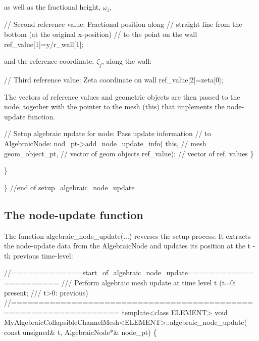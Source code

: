 as well as the fractional height, $ \omega_j $,


\begin{DoxyCodeInclude}
     \textcolor{comment}{// Second reference value: Fractional position along }
     \textcolor{comment}{// straight line from the bottom (at the original x-position)}
     \textcolor{comment}{// to the point on the wall}
     ref\_value[1]=y/r\_wall[1];

\end{DoxyCodeInclude}


and the reference coordinate, $ \zeta_j $, along the wall\+:


\begin{DoxyCodeInclude}
     \textcolor{comment}{// Third reference value: Zeta coordinate on wall}
     ref\_value[2]=zeta[0];   

\end{DoxyCodeInclude}


The vectors of reference values and geometric objects are then passed to the node, together with the pointer to the mesh ({\ttfamily this}) that implements the node-\/update function.


\begin{DoxyCodeInclude}

     \textcolor{comment}{// Setup algebraic update for node: Pass update information}
     \textcolor{comment}{// to AlgebraicNode:}
     nod\_pt->add\_node\_update\_info(
      \textcolor{keyword}{this},               \textcolor{comment}{// mesh}
      geom\_object\_pt,     \textcolor{comment}{// vector of geom objects}
      ref\_value);         \textcolor{comment}{// vector of ref. values}
    \}
   
  \}

\} \textcolor{comment}{//end of setup\_algebraic\_node\_update}

\end{DoxyCodeInclude}
 

\hypertarget{index_node_update}{}\subsection{The node-\/update function}\label{index_node_update}
The function {\ttfamily algebraic\+\_\+node\+\_\+update}(...) reverses the setup process\+: It extracts the node-\/update data from the {\ttfamily Algebraic\+Node} and updates its position at the {\ttfamily t} -\/th previous time-\/level\+:


\begin{DoxyCodeInclude}
\textcolor{comment}{//=============start\_of\_algebraic\_node\_update======================}
\textcolor{comment}{/// Perform algebraic mesh update at time level t (t=0: present; }
\textcolor{comment}{}\textcolor{comment}{/// t>0: previous)}
\textcolor{comment}{}\textcolor{comment}{//=================================================================}
\textcolor{keyword}{template}<\textcolor{keyword}{class} ELEMENT>
\textcolor{keywordtype}{void} MyAlgebraicCollapsibleChannelMesh<ELEMENT>::algebraic\_node\_update(
 \textcolor{keyword}{const} \textcolor{keywordtype}{unsigned}& t, AlgebraicNode*& node\_pt)
\{

\end{DoxyCodeInclude}


